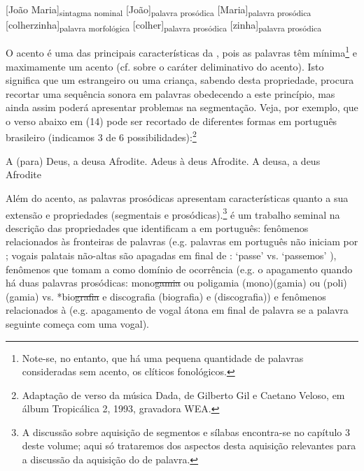\documentclass[output=paper]{LSP/langsci}
\begin{document}
\ea\label{ex:santana_12}
[João Maria]\textsubscript{sintagma nominal} [João]\textsubscript{palavra prosódica} [Maria]\textsubscript{palavra prosódica}
\z
\ea\label{ex:santana_13}
[colherzinha]\textsubscript{palavra morfológica} [colher]\textsubscript{palavra prosódica} [zinha]\textsubscript{palavra prosódica}
\z

O acento é uma das principais características da , pois as palavras têm mínima\footnote{Note-se, no entanto, que há uma pequena quantidade de palavras consideradas sem acento, os clíticos fonológicos.} e maximamente um acento (cf. \citealt{jakobson1941} sobre o caráter deliminativo do acento). Isto significa que um estrangeiro ou uma criança, sabendo desta propriedade, procura recortar uma sequência sonora em palavras obedecendo a este princípio, mas ainda assim poderá apresentar problemas na segmentação. Veja, por exemplo, que o verso abaixo em (14) pode ser recortado de diferentes formas em português brasileiro (indicamos 3 de 6 possibilidades):\footnote{Adaptação de verso da música Dada, de Gilberto Gil e Caetano Veloso, em álbum Tropicálica 2, 1993, gravadora WEA.}\newpage

\ea\label{ex:santana_14}
\ea\label{ex:santana_14a}
A (para) Deus, a deusa Afrodite.
\ex\label{ex:santana_14b}
Adeus à deus Afrodite.
\ex\label{ex:santana_14c}
A deusa, a deus Afrodite
\zl

Além do acento, as palavras prosódicas apresentam características quanto a sua extensão e propriedades (segmentais e prosódicas).\footnote{A discussão sobre aquisição de segmentos e sílabas encontra-se no capítulo 3 deste volume; aqui só trataremos dos aspectos desta aquisição relevantes para a discussão da aquisição do  de palavra.} \citet{vigario2003} é um trabalho seminal na descrição das propriedades que identificam a  em português: fenômenos relacionados às fronteiras de palavras (e.g. palavras em português não iniciam por \ipa{[\textltailn,R,L]}; vogais palatais não-altas são apagadas em final de : `passe'  vs. `passemos' ), fenômenos que tomam a  como domínio de ocorrência (e.g. o apagamento quando há duas palavras prosódicas: mono\sout{gamia} ou poligamia (mono)(gamia) ou (poli)(gamia) vs. *bio\sout{grafia} e discografia (biografia) e (discografia)) e fenômenos relacionados à  (e.g. apagamento de vogal átona em final de palavra se a palavra seguinte começa com uma vogal). 
\end{document}

